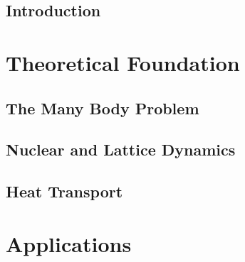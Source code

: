 \documentclass[nobib,a4paper,twoside,notoc,justified,marginals=justified]{tufte-book}
\newcommand{\blankpage}{\newpage\hbox{}\thispagestyle{empty}\newpage}
\begin{document}
\frontmatter
{}
  
%  

\tableofcontents





\cleardoublepage

\chapter{Introduction}


\mainmatter
{}  %

\part{Theoretical Foundation}

\chapter{The Many Body Problem}


\chapter{Nuclear and Lattice Dynamics}

%
\chapter{Heat Transport}



\part{Applications}
\end{document}
